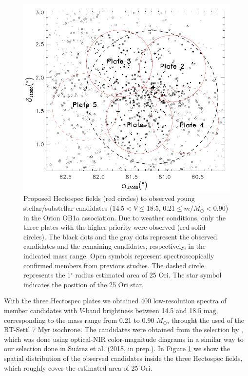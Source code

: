 \documentclass[12pt]{article}
\newcounter{subsubsubsection}[subsubsection]
\begin{document}
\begin{figure}%
	\includegraphics[width=1.0\textwidth]{sky_MMT.pdf}
	\caption[Plate design for the Hectospec observations.]{Proposed Hectospec fields (red circles) to observed young stellar/substellar candidates (14.5$<V\leq$18.5, 0.21$\leq m/M_\odot <$0.90) in the Orion OB1a association. Due to weather conditions, only the three plates with the higher priority were observed (red solid circles). The black dots and the gray dots represent the observed candidates and the remaining candidates, respectively, in the indicated mass range. Open symbols represent spectroscopically confirmed members from previous studies. The dashed circle represents the 1$^\circ$ radius estimated area of 25 Ori. The star symbol indicates the position of the 25 Ori star.}
	\label{fig:sky_MMT}
\end{figure}

\label{sec_Hectospec:targets}
With the three Hectospec plates we obtained 400 low-resolution spectra of member candidates with $V$-band brightness between 14.5 and 18.5 mag, corresponding to the mass range from 0.21 to 0.90 $M_\odot$, throught the used of the BT-Settl 7 Myr isochrone. The candidates were obtained from the selection by \citet{Downes2014}, which was done using optical-NIR color-magnitude diagrams in a similar way to our selection done in Su\'arez et al. (2018, in prep.). In Figure \ref{fig:sky_MMT} we show the spatial distribution of the observed candidates inside the three Hectospec fields, which roughly cover the estimated area of 25 Ori.
\end{document}
